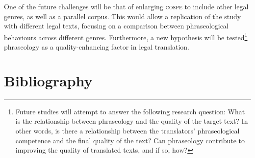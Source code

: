 \documentclass[output=paper]{LSP/langsci}
\begin{document}
One of the future challenges will be that of enlarging \textsc{cospe} to include other legal genres, as well as a parallel corpus. This would allow a replication of the study with different legal texts, focusing on a comparison between phraseological behaviours across different genres. Furthermore, a new hypothesis will be tested\footnote{Future studies will attempt to answer the following research question: What is the relationship between phraseology and the quality of the target text? In other words, is there a relationship between the translators’ phraseological competence and the final quality of the text? Can phraseology contribute to improving the quality of translated texts, and if so, how?} phraseology as a quality-enhancing factor in legal translation.



\section{Bibliography}


\printbibliography[heading=subbibliography,notkeyword=this]
\end{document}
